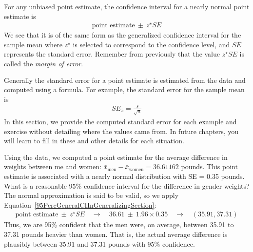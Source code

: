 \begin{termBox}{\label{generalConfidenceIntervalTermBox}%
For any unbiased point estimate, the confidence interval for a nearly normal point estimate is
\begin{eqnarray}
\text{point estimate}\ \pm\ z^{\star}SE
\label{95PercGeneralCIInGeneralizingSection}
\end{eqnarray}
We see that it is of the same form as the generalized confidence interval for the sample mean where $z^{\star}$ is selected to correspond to the confidence level, and $SE$ represents the standard error. Remember from previously that the value $z^{\star}SE$ is called the \emph{margin of error}.}
\end{termBox}

Generally the standard error for a point estimate is estimated from the data and computed using a formula. For example, the standard error for the sample mean is
\begin{eqnarray*}
SE_{\bar{x}} = \frac{s}{\sqrt{n}}
\end{eqnarray*}
In this section, we provide the computed standard error for each example and exercise without detailing where the values came from. In future chapters, you will learn to fill in these and other details for each situation.

\begin{example}{Using the  data, we computed a point estimate for the average difference in weights between me and women: $\bar{x}_\mathrm{{men}}-\bar{x}_\mathrm{{women}}= 36.61162$ pounds. This point estimate is associated with a nearly normal distribution with SE = 0.35 pounds. What is a reasonable 95\% confidence interval for the difference in gender weights?}
\label{confIntervalForDifferenceOfRunTimeBetweenGenders}
The normal approximation is said to be valid, so we apply Equation~\eqref{95PercGeneralCIInGeneralizingSection}:
\begin{eqnarray*}
\text{point estimate}\ \pm\ z^{\star} SE
	\quad\rightarrow\quad 36.61\ \pm\ 1.96\times 0.35
	\quad\rightarrow\quad (35.91, 37.31)
\end{eqnarray*}
Thus, we are 95\% confident that the men were, on average, between 35.91 to 37.31 pounds heavier than women. That is, the actual average difference is plausibly between 35.91 and 37.31 pounds with 95\% confidence.
\end{example}


